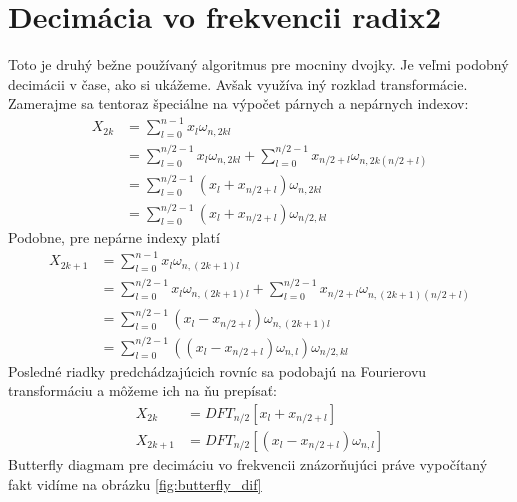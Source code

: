 \section{Decimácia vo frekvencii radix2}
Toto je druhý bežne používaný algoritmus pre mocniny dvojky. Je veľmi
podobný decimácii v čase, ako si ukážeme. Avšak využíva iný rozklad
transformácie. Zamerajme sa tentoraz  špeciálne na výpočet párnych a
nepárnych indexov:
\begin{equation}
    \begin{split}
    X_{2k} &= \sum_{l=0}^{n-1} x_l \omega_{n,2kl} \\
            &= \sum_{l=0}^{n/2-1} x_l \omega_{n,2kl} +
              \sum_{l=0}^{n/2-1} x_{n/2+l} \omega_{n, 2k(n/2 + l)} \\
            &= \sum_{l=0}^{n/2-1} (x_l + x_{n/2+l}) \omega_{n, 2kl} \\
            &= \sum_{l=0}^{n/2-1} (x_l + x_{n/2+l}) \omega_{n/2, kl} 
    \end{split}
\end{equation}
Podobne, pre nepárne indexy platí
\begin{equation}
    \begin{split}
    X_{2k+1} &= \sum_{l=0}^{n-1} x_l \omega_{n,(2k+1)l} \\
            &= \sum_{l=0}^{n/2-1} x_l \omega_{n,(2k+1)l} +
              \sum_{l=0}^{n/2-1} x_{n/2+l} \omega_{n, (2k+1)(n/2 + l)} \\
            &= \sum_{l=0}^{n/2-1} (x_l - x_{n/2+l}) \omega_{n, (2k+1)l} \\
            &= \sum_{l=0}^{n/2-1} ((x_l - x_{n/2+l})
              \omega_{n,l} )
            \omega_{n/2, kl}
    \end{split}
\end{equation}
Posledné riadky predchádzajúcich rovníc sa podobajú na Fourierovu
transformáciu a môžeme ich na ňu prepísať:
\begin{align}
    X_{2k} &= DFT_{n/2}[x_l + x_{n/2+l}] \\
    X_{2k+1} &= DFT_{n/2}[(x_l - x_{n/2+l}) \omega_{n,l}]
\end{align}
Butterfly diagmam pre decimáciu vo frekvencii 
znázorňujúci práve vypočítaný fakt
vidíme na obrázku \ref{fig:butterfly_dif}

